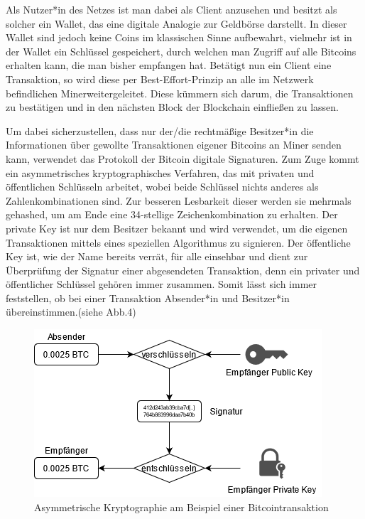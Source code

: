 \documentclass[12pt,oneside]{article}
\begin{document}
Als Nutzer*in des Netzes ist man dabei als Client anzusehen und besitzt als solcher ein Wallet, das eine digitale Analogie zur Geldbörse darstellt. In dieser Wallet sind jedoch keine Coins im klassischen Sinne aufbewahrt, vielmehr ist in der Wallet ein Schlüssel gespeichert, durch welchen man Zugriff auf alle Bitcoins erhalten kann, die man bisher empfangen hat. Betätigt nun ein Client eine Transaktion, so wird diese per \glqq Best-Effort\grqq -Prinzip an alle im Netzwerk befindlichen \glqq Miner\grqq  weitergeleitet. Diese kümmern sich darum, die Transaktionen zu bestätigen und in den nächsten Block der Blockchain einfließen zu lassen.

Um dabei sicherzustellen, dass nur der/die rechtmäßige Besitzer*in die Informationen über gewollte Transaktionen eigener Bitcoins an Miner senden kann, verwendet das Protokoll der Bitcoin digitale Signaturen. Zum Zuge kommt ein asymmetrisches kryptographisches Verfahren, das mit privaten und öffentlichen Schlüsseln arbeitet, wobei beide Schlüssel nichts anderes als Zahlenkombinationen sind. Zur besseren Lesbarkeit dieser werden sie mehrmals gehashed, um am Ende eine 34-stellige Zeichenkombination zu erhalten. Der private Key ist nur dem Besitzer bekannt und wird verwendet, um die eigenen Transaktionen mittels eines speziellen Algorithmus zu signieren. Der öffentliche Key ist, wie der Name bereits verrät, für alle einsehbar und dient zur Überprüfung der Signatur einer abgesendeten Transaktion, denn ein privater und öffentlicher Schlüssel gehören immer zusammen. Somit lässt sich immer feststellen, ob bei einer Transaktion Absender*in und Besitzer*in übereinstimmen.(siehe Abb.4)
\cite[p. 69-80]{soeteman2019}\cite{binance}


\begin{figure}[h]
\centering
\includegraphics[scale=0.9]{./images/pubprivkey.png}
\caption{Asymmetrische Kryptographie am Beispiel einer Bitcointransaktion \cite{coincierge}}
\centering
\end{figure}
\end{document}
